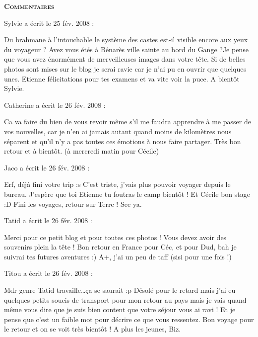 \bigskip
\textbf{\textsc{Commentaires}}

\medskip
Sylvie a écrit le 25 fév. 2008 :
\begin{displayquote}
Du brahmane à l'intouchable le système des castes est-il visible encore aux yeux du voyageur ?
Avez vous étés à Bénarès ville sainte au bord du Gange ?Je pense que vous avez énormément de merveilleuses images dans votre tête. Si de belles photos sont mises sur le blog je serai ravie car je n'ai pu en ouvrir que quelques unes. Etienne félicitations pour tes examens et va vite voir la puce. A bientôt Sylvie.
\end{displayquote}

\medskip
Catherine a écrit le 26 fév. 2008 :
\begin{displayquote}
Ca va faire du bien de vous revoir même s'il me faudra apprendre à me passer de vos nouvelles, car je n'en ai jamais autant quand moins de kilomètres nous séparent et qu'il n'y a pas toutes ces émotions à nous faire partager.
Très bon retour et à bientôt. (à mercredi matin pour Cécile)
\end{displayquote}

\medskip
Jaco a écrit le 26 fév. 2008 :
\begin{displayquote}
Erf, déjà fini votre trip :s C'est triste, j'vais plus pouvoir voyager depuis le bureau.
J'espère que toi Etienne tu foutras le camp bientôt !
Et Cécile bon stage :D Fini les voyages, retour sur Terre !
See ya.
\end{displayquote}

\medskip
Tatid a écrit le 26 fév. 2008 :
\begin{displayquote}
Merci pour ce petit blog et pour toutes ces photos ! Vous devez avoir des souvenirs plein la tête !
Bon retour en France pour Céc, et pour Dud, bah je suivrai tes futures aventures :)
A+, j'ai un peu de taff (sisi pour une fois !)
\end{displayquote}

\medskip
Titou a écrit le 26 fév. 2008 :
\begin{displayquote}
Mdr genre Tatid travaille\dots ça se saurait :p
Désolé pour le retard mais j'ai eu quelques petits soucis de transport pour mon retour au pays mais je vais quand même vous dire que je suis bien content que votre séjour vous ai ravi ! Et je pense que c'est un faible mot pour décrire ce que vous ressentez. Bon voyage pour le retour et on se voit très bientôt !
A plus les jeunes, Biz.
\end{displayquote}

